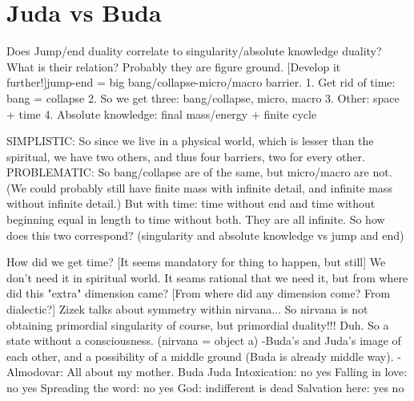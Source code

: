 \documentclass[10pt]{book}
\begin{document}
\chapter{Juda vs Buda}

Does Jump/end duality correlate to singularity/absolute knowledge duality? What is their relation? Probably they are figure ground. [Develop it further!]jump-end = big bang/collapse-micro/macro barrier.
1. Get rid of time: bang = collapse
2. So we get three: bang/collapse, micro, macro
3. Other: space + time
4. Absolute knowledge: final mass/energy + finite cycle

SIMPLISTIC:
So since we live in a physical world, which is lesser than the spiritual, we have two others, and thus four barriers, two for every other.
PROBLEMATIC:
So bang/collapse are of the same, but micro/macro are not. (We could probably still have finite mass with infinite detail, and infinite mass without infinite detail.) But with time: time without end and time without beginning equal in length to time without both. They are all infinite.
So how does this two correspond? (singularity and absolute knowledge vs jump and end)

How did we get time? [It seems mandatory for thing to happen, but still] We don't need it in spiritual world. It seams rational that we need it, but from where did this "extra" dimension came? [From where did any dimension come? From dialectic?] 
Zizek talks about symmetry within nirvana... So nirvana is not obtaining primordial singularity of course, but primordial duality!!! Duh. So a state without a consciousness. (nirvana = object a)
-Buda's and Juda's image of each other, and a possibility of a middle ground (Buda is already middle way).
-Almodovar: All about my mother.
					Buda		Juda
Intoxication:		no			yes
Falling in love:	no			yes
Spreading the word: no			yes
God:				indifferent	is dead
Salvation here:		yes			no
\end{document}
